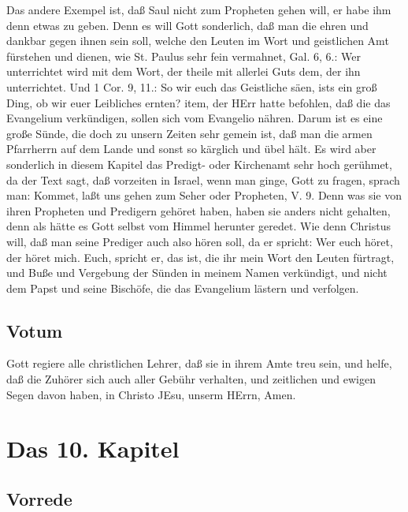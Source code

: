 Das andere Exempel ist, daß Saul nicht zum Propheten gehen will, er habe ihm denn etwas zu geben. Denn es will Gott sonderlich, daß man die ehren und dankbar gegen ihnen sein soll, welche den Leuten im Wort und geistlichen Amt fürstehen und dienen, wie St. Paulus sehr fein vermahnet, Gal. 6, 6.: Wer unterrichtet wird mit dem Wort, der theile mit allerlei Guts dem, der ihn unterrichtet. Und 1 Cor. 9, 11.: So wir euch das Geistliche säen, ists ein groß Ding, ob wir euer Leibliches ernten? item, der HErr hatte befohlen, daß die das Evangelium verkündigen, sollen sich vom Evangelio nähren. Darum ist es eine große Sünde, die doch zu unsern Zeiten sehr gemein ist, daß man die armen Pfarrherrn auf dem Lande und sonst so kärglich und übel hält. Es wird aber sonderlich in diesem Kapitel das Predigt- oder Kirchenamt sehr hoch gerühmet, da der Text sagt, daß vorzeiten in Israel, wenn man ginge, Gott zu fragen, sprach man: Kommet, laßt uns gehen zum Seher oder Propheten, V. 9. Denn was sie von ihren Propheten und Predigern gehöret haben, haben sie anders nicht gehalten, denn als hätte es Gott selbst vom Himmel herunter geredet. Wie denn Christus will, daß man seine Prediger auch also hören soll, da er spricht: Wer euch höret, der höret mich. Euch, spricht er, das ist, die ihr mein Wort den Leuten fürtragt, und Buße und Vergebung der Sünden in meinem Namen verkündigt, und nicht dem Papst und seine Bischöfe, die das Evangelium lästern und verfolgen.

\section{Votum}

Gott regiere alle christlichen Lehrer, daß sie in ihrem Amte treu sein, und helfe, daß die Zuhörer sich auch aller Gebühr verhalten, und zeitlichen und ewigen Segen davon haben, in Christo JEsu, unserm HErrn, Amen.

\chapter{Das 10. Kapitel}

\section{Vorrede}

